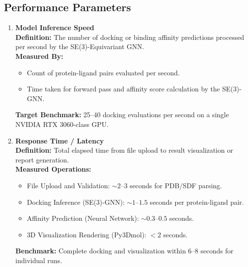 \documentclass[12pt,a4]{report}
\begin{document}
\subsection{Performance Parameters}
\begin{enumerate}[label=\textbf{\Alph*.}, leftmargin=1.2cm]

    \item \textbf{Model Inference Speed} \\
    \hspace{0.3in}
    \textbf{Definition:} The number of docking or binding affinity predictions processed per second by the SE(3)-Equivariant GNN. \\
    \hspace{0.3in}
    \textbf{Measured By:}
    \begin{itemize}
        \item Count of protein-ligand pairs evaluated per second.
        \item Time taken for forward pass and affinity score calculation by the SE(3)-GNN.
    \end{itemize}
    \hspace{0.3in}
    \textbf{Target Benchmark:} 25–40 docking evaluations per second on a single NVIDIA RTX 3060-class GPU.

    \vspace{0.4cm}
    \item \textbf{Response Time / Latency} \\
    \hspace{0.3in}
    \textbf{Definition:} Total elapsed time from file upload to result visualization or report generation. \\
    \hspace{0.3in}
    \textbf{Measured Operations:}
    \begin{itemize}
        \item File Upload and Validation: \(\sim 2–3\) seconds for PDB/SDF parsing.
        \item Docking Inference (SE(3)-GNN): \(\sim 1–1.5\) seconds per protein-ligand pair.
        \item Affinity Prediction (Neural Network): \(\sim 0.3–0.5\) seconds.
        \item 3D Visualization Rendering (Py3Dmol): \(< 2\) seconds.
    \end{itemize}
    \hspace{0.3in}
    \textbf{Benchmark:} Complete docking and visualization within 6–8 seconds for individual runs.


\end{enumerate}
\end{document}
